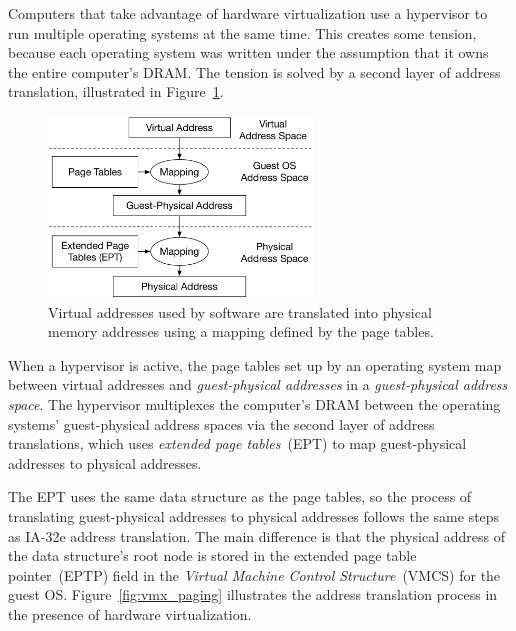 
Computers that take advantage of hardware virtualization use a hypervisor to
run multiple operating systems at the same time. This creates some tension,
because each operating system was written under the assumption that it owns the
entire computer's DRAM. The tension is solved by a second layer of address
translation, illustrated in Figure~\ref{fig:vmx_address_translation}.

\begin{figure}[hbt]
  \centering
  \includegraphics[width=70mm]{figures/vmx_address_translation.pdf}
  \caption{
    Virtual addresses used by software are translated into physical memory
    addresses using a mapping defined by the page tables.
  }
  \label{fig:vmx_address_translation}
\end{figure}


When a hypervisor is active, the page tables set up by an operating system map
between virtual addresses and \textit{guest-physical addresses} in a
\textit{guest-physical address space}. The hypervisor multiplexes the
computer's DRAM between the operating systems' guest-physical address spaces
via the second layer of address translations, which uses \textit{extended page
tables}~(EPT) to map guest-physical addresses to physical addresses.

The EPT uses the same data structure as the page tables, so the process of
translating guest-physical addresses to physical addresses follows the same
steps as IA-32e address translation. The main difference is that the physical
address of the data structure's root node is stored in the extended page table
pointer~(EPTP) field in the \textit{Virtual Machine Control Structure}~(VMCS)
for the guest OS. Figure~\ref{fig:vmx_paging} illustrates the address
translation process in the presence of hardware virtualization.

